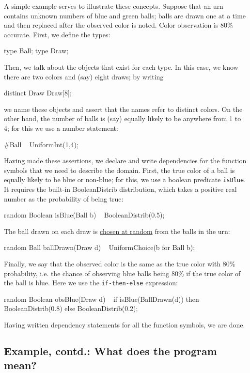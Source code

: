 \documentclass[12pt]{article}
\begin{document}
A simple example serves to illustrate these concepts. Suppose that an urn contains unknown numbers of blue and green balls;
balls are drawn one at a time and then replaced after the observed color is noted. Color observation is 80\% accurate.
First, we define the types:
\begin{blogcode}
type Ball; type Draw; 
\end{blogcode}
Then, we talk about the objects that exist for each type.
In this case, we know there are two colors and (say) eight draws; by writing
\begin{blogcode}
distinct Draw Draw[8];
\end{blogcode}
we name these objects and assert that the names refer to distinct colors.
On the other hand, the number of balls is (say) equally likely to be anywhere from 1 to 4; for this we use a number statement:
\begin{blogcode}
#Ball ~ UniformInt(1,4);
\end{blogcode}
Having made these assertions, we declare and write dependencies for the function symbols
that we need to describe the domain. First, the true color of a ball is 
equally likely to be blue or non-blue; for this, we use a boolean predicate 
\verb|isBlue|. It requires the built-in
{BooleanDistrib distribution}, which takes a positive real number as 
the probability of being true:
\begin{blogcode}
random Boolean isBlue(Ball b) ~ BooleanDistrib(0.5);
\end{blogcode}
The ball drawn on each draw is \hyperref[uniformchoice-section]{chosen at random} from the balls in the urn:
\begin{blogcode}
random Ball ballDrawn(Draw d) ~ UniformChoice({b for Ball b});
\end{blogcode}
Finally, we say that the observed color is the same as the true color
with 80\% probability, i.e. the chance of observing blue balls being 
80\% if the true color of the ball is blue.
Here we use the \verb|if-then-else| expression:
\begin{blogcode}
random Boolean obsBlue(Draw d) ~
  if isBlue(BallDrawn(d)) then 
    BooleanDistrib(0.8)
  else
    BooleanDistrib(0.2);
\end{blogcode}
Having written dependency statements for all the function symbols, we are done.

\subsection{Example, contd.: What does the program mean?}
\end{document}
